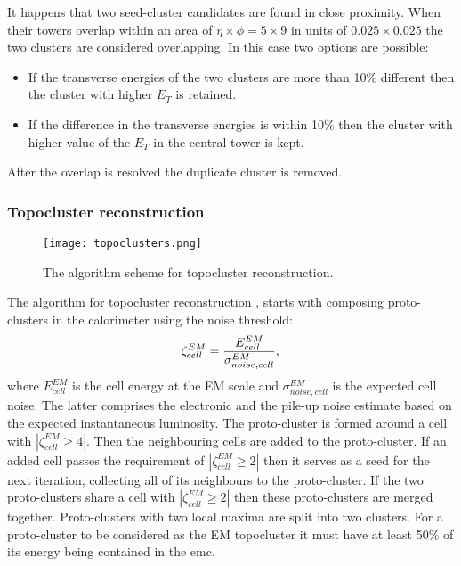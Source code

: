      It happens that two seed-cluster candidates are found in close proximity. When their towers overlap within an area of $\eta \times \phi=5\times 9$ in units of $0.025\times0.025$ the two clusters are considered overlapping. In this case two options are possible:
      \begin{itemize}
     	\item If the transverse energies of the two clusters are more than 10\% different then the cluster with higher $E_T$ is retained.
     	\item If the difference in the transverse energies is within 10\% then the cluster with higher value of the $E_T$ in the central tower is kept.
     \end{itemize}
 	After the overlap is resolved the duplicate cluster is removed.\\
 	 \subsubsection{Topocluster reconstruction}
 	  	 	\label{sec::topocluster}
 	  	\begin{figure}[htbp]
 	 	\centering
 	 	\texttt{[image: topoclusters.png]}
 	 	\caption[topocluster]{The algorithm scheme for topocluster reconstruction.}
 	 	\label{fig::topocluster}
 	 \end{figure}
 	 The algorithm for topocluster reconstruction \cite{topoclust2_2016}, \cite{topoclust_2019} starts with composing proto-clusters in the calorimeter using the noise threshold:
 	 \begin{equation}
 	 	\zeta_{cell}^{EM} =\frac{E_{cell}^{EM}}{\sigma_{noise,cell}^{EM}},\\
 	 \end{equation}
 	 where $E_{cell}^{EM}$ is the cell energy at the EM scale and $\sigma_{noise,cell}^{EM}$ is the expected cell noise. The latter comprises the electronic and the pile-up noise estimate based on the expected instantaneous luminosity. The proto-cluster is formed around a cell with $|\zeta_{cell}^{EM} \ge 4|$. Then the neighbouring cells are added to the proto-cluster. If an added cell passes the requirement of $|\zeta_{cell}^{EM} \ge 2 |$ then it serves as a seed for the next iteration, collecting all of its neighbours to the proto-cluster. If the two proto-clusters share a cell with $|\zeta_{cell}^{EM} \ge 2|$ then these proto-clusters are merged together. Proto-clusters with two local maxima are split into two clusters. For a proto-cluster to be considered as the EM topocluster it must have at least 50\% of its energy being contained in the \gls{emc}.
